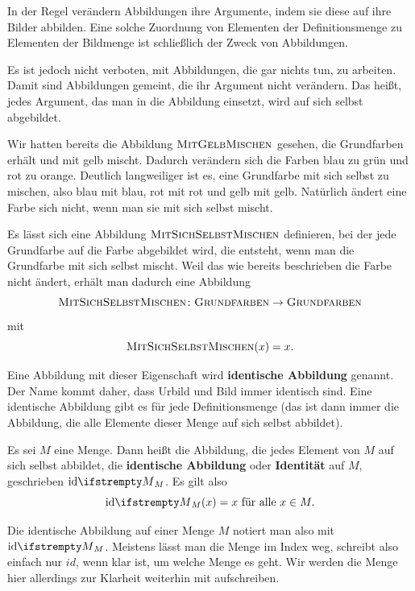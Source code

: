 \documentclass[../../main.tex]{subfiles}
\begin{document}
In der Regel verändern Abbildungen ihre Argumente, indem sie diese auf ihre Bilder abbilden. Eine solche Zuordnung von Elementen der Definitionsmenge zu Elementen der Bildmenge ist schließlich der Zweck von Abbildungen. 

Es ist jedoch nicht verboten, mit Abbildungen, die gar nichts tun, zu arbeiten. Damit sind Abbildungen gemeint, die ihr Argument nicht verändern. Das heißt, jedes Argument, das man in die Abbildung einsetzt, wird auf sich selbst abgebildet.

\begin{example}{}
    \parpic[r]{}
    Wir hatten bereits die Abbildung $\textsc{MitGelbMischen}$ gesehen, die Grundfarben erhält und mit gelb mischt. Dadurch verändern sich die Farben blau zu grün und rot zu orange. Deutlich langweiliger ist es, eine Grundfarbe mit sich selbst zu mischen, also blau mit blau, rot mit rot und gelb mit gelb. Natürlich ändert eine Farbe sich nicht, wenn man sie mit sich selbst mischt.
    
    Es lässt sich eine Abbildung $\textsc{MitSichSelbstMischen}$ definieren, bei der jede Grundfarbe auf die Farbe abgebildet wird, die entsteht, wenn man die Grundfarbe mit sich selbst mischt. Weil das wie bereits beschrieben die Farbe nicht ändert, erhält man dadurch eine Abbildung
    \[\textsc{MitSichSelbstMischen}\colon\textsc{Grundfarben}\rightarrow\textsc{Grundfarben}\]
    mit
    \[\textsc{MitSichSelbstMischen}(x)=x.\]
\end{example}

Eine Abbildung mit dieser Eigenschaft wird \textbf{identische Abbildung} genannt. Der Name kommt daher, dass Urbild und Bild immer identisch sind. Eine identische Abbildung gibt es für jede Definitionsmenge (das ist dann immer die Abbildung, die alle Elemente dieser Menge auf sich selbst abbildet).

\begin{definition}
    Es sei $M$ eine Menge. Dann heißt die Abbildung, die jedes Element von $M$ auf sich selbst abbildet, die \textbf{identische Abbildung} oder \textbf{Identität} auf $M$, geschrieben $\ident[M]$. Es gilt also \[\ident[M](x)=x\text{~für alle~}x\in M.\]
\end{definition}

Die identische Abbildung auf einer Menge $M$ notiert man also mit $\ident[M]$. Meistens lässt man die Menge im Index weg, schreibt also einfach nur $id$, wenn klar ist, um welche Menge es geht. Wir werden die Menge hier allerdings zur Klarheit weiterhin mit aufschreiben.
\end{document}
